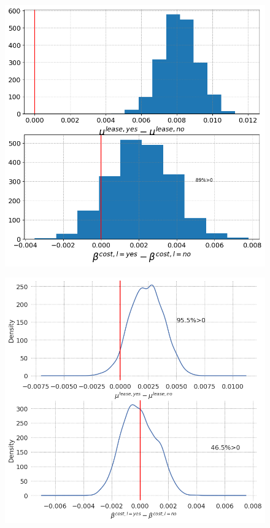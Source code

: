 \documentclass[a4paper]{article}
\begin{document}
\begin{figure}
\begin{minipage}{.48\textwidth}
  \centering
  \includegraphics[width=1\linewidth]{figures/bayes_hypos.png}
  \label{fig:contrasts}
 \end{minipage}\qquad
\begin{minipage}{.48\textwidth}
  \centering
  \includegraphics[width=1\linewidth]{figures/bayes_hypos_const.png}

\end{minipage}
\end{figure}
\end{document}
